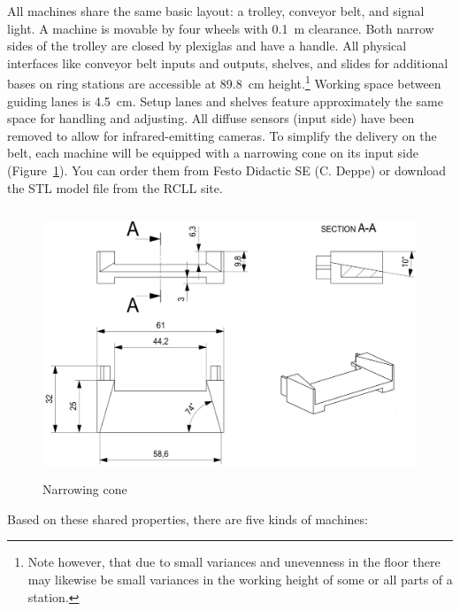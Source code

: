 \documentclass[12pt,twoside]{article}
\newcommand{\reffig}[1]{Figure~\ref{#1}}
\begin{document}
All machines share the same basic layout: a trolley, conveyor belt,
and signal light. A machine is movable by four wheels with
\SI{0.1}{\metre} clearance. Both narrow sides of the trolley are
closed by plexiglas and have a handle. All physical interfaces like
conveyor belt inputs and outputs, shelves, and slides for additional
bases on ring stations are accessible at \SI{89.8}{\centi\metre}
height.\footnote{Note however, that due to small variances and
  unevenness in the floor there may likewise be small variances in the
  working height of some or all parts of a station.} Working space
between guiding lanes is \SI{4.5}{\centi\metre}. Setup lanes and
shelves feature approximately the same space for handling and
adjusting. All diffuse sensors (input side) have been removed to allow for infrared-emitting cameras.
To simplify the delivery on the belt, each machine will be
equipped with a narrowing cone on its input side (\reffig{fig:narrow-cone}).
You can order them from Festo Didactic SE (C. Deppe)
or download the STL model file from the RCLL site.
\begin{figure}
    \includegraphics[height=8cm]{narrowConeSketch.jpg}
\caption{Narrowing cone}
\label{fig:narrow-cone}
\end{figure}
%
Based on these shared properties, there are five kinds of machines:
\end{document}
